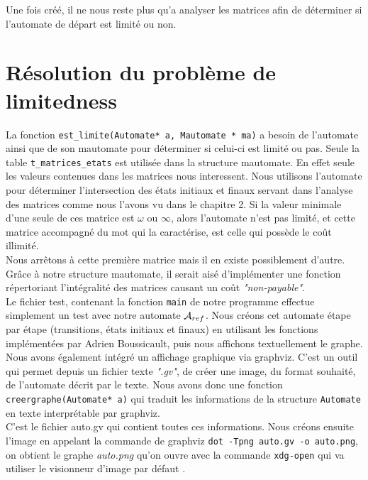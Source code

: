 \documentclass{report}
\begin{document}
Une fois créé, il ne nous reste plus qu'a analyser les matrices afin de déterminer si l'automate de départ est limité ou non.\\

\chapter{Résolution du problème de limitedness}

La fonction \verb?est_limite(Automate* a, Mautomate * ma)? a besoin de l'automate ainsi que de son mautomate pour déterminer si celui-ci est limité ou pas. Seule la table \verb?t_matrices_etats? est utilisée dans la structure mautomate. En effet seule les valeurs contenues dans les matrices nous interessent. Nous utilisons l'automate pour déterminer l'intersection des états initiaux et finaux servant dans l'analyse des matrices comme nous l'avons vu dans le chapitre 2. Si la valeur minimale d'une seule de ces matrice est $\omega$ ou $\infty$, alors l'automate n'est pas limité, et cette matrice accompagné du mot qui la caractérise, est celle qui possède le coût illimité.\\
Nous arrêtons à cette première matrice mais il en existe possiblement d'autre. Grâce à notre structure mautomate, il serait aisé d'implémenter une fonction répertoriant l'intégralité des matrices causant un coût \textit{"non-payable"}.\\

Le fichier test, contenant la fonction \verb?main? de notre programme effectue simplement un test avec notre automate $\mathcal{A}_{ref}$. Nous créons cet automate étape par étape (transitions, états initiaux et finaux) en utilisant les fonctions implémentées par Adrien Boussicault, puis nous affichons textuellement le graphe. \\

Nous avons également intégré un affichage graphique via graphviz. C'est un outil qui permet depuis un fichier texte \textit{".gv"}, de créer une image, du format souhaité, de l'automate décrit par le texte. Nous avons donc une fonction \verb?creergraphe(Automate* a)? qui traduit les informations de la structure \verb?Automate? en texte interprétable par graphviz.\\
C'est le fichier auto.gv qui contient toutes ces informations. Nous créons ensuite l'image en appelant la commande de graphviz  \verb?dot -Tpng auto.gv -o auto.png?, on obtient le graphe \textit{auto.png} qu'on ouvre avec la commande \verb?xdg-open? qui va utiliser le visionneur d'image par défaut .\\
\end{document}
